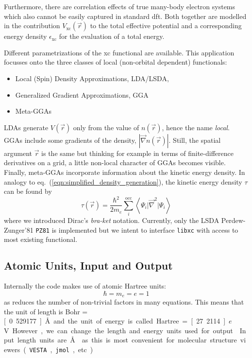 \documentclass[oribibl]{llncs}
\newcommand{\um}[1]{_{\mathrm{#1}}}
\newcommand{\ttt}[1]{\texttt{#1}}
\newcommand{\braketop}[3]{\left\langle \left. #1 \right| #2 \left| #3 \right. \right\rangle}
\begin{document}
Furthermore, there are correlation effects of true many-body electron systems
which also cannot be easily captured in standard \ac{dft}.
Both together are modelled in the contribution $V\um{xc}(\vec r)$ 
to the total effective potential and a corresponding energy density $\epsilon\um{xc}$ for the evaluation of a total energy.

Different parametrizations of the \ac{xc} functional are available.
This application focusses onto the three classes of local (non-orbital dependent) functionals: 
\begin{itemize} 
	\item Local (Spin) Density Approximations, LDA/LSDA, 
	\item Generalized Gradient Approximations, GGA
	\item Meta-GGAs
\end{itemize}
LDAs generate $V(\vec r)$ only from the value of $n(\vec r)$, 
hence the name \emph{local}. 
GGAs include some gradients of the density, $|\vec \nabla n(\vec r)|$.
Still, the spatial argument $\vec r$ is the same but thinking for example
in terms of finite-difference derivatives on a grid, 
a little non-local character of GGAs becomes visible.
Finally, meta-GGAs incorporate information about the kinetic energy density.
In analogy to eq.~(\ref{eqn:simplified_density_generation}), the kinetic energy density $\tau$ can be found by
\begin{equation}
	\tau(\vec r) = \frac{\hbar^2}{2m_e} \sum_i^{\mathrm{occ}} \braketop{ \Psi_i } {\vec \nabla^2 } { \Psi_i } 
	\label{eqn:simplified_kinetic_energy_density_generation}
\end{equation}
where we introduced Dirac's \emph{bra-ket} notation.
Currently, only the LSDA Perdew-Zunger'81 \ttt{PZ81} is implemented 
but we intent to interface \ttt{libxc} with access to most existing functional.


\subsection{Atomic Units, Input and Output}
Internally the code makes use of atomic Hartree units:
\begin{equation}
	\hbar = m_e = e = 1
\end{equation}
as reduces the number of non-trivial factors in many equations.
This means that the unit of length is Bohr = \unit[0.529177]{\AA{}}
and the unit of energy is called Hartree = \unit[27.2114]{$e$V}.
However, we can change the length and energy units used for output.
Input length units are \AA{} as this is most convenient for molecular structure viewers
(\ttt{VESTA}, \ttt{jmol}, etc.)
\end{document}
